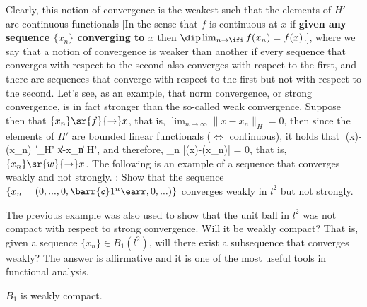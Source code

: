 \espa
Clearly, this notion of convergence is the weakest such that the 
elements
of $H'$ are continuous functionals [In the sense that $f$ is
continuous at $x$ if {\bf given any sequence $\{x_n\}$
converging to $x$} then $\dip\lim_{n\to\ifi}f(x_n)=f(x)$.], where we say 
that a notion of
convergence is weaker than another if every sequence that
converges with respect to
the second also converges with respect to the first, and there are sequences
that converge with respect to the first but not with respect to the second.
Let's see, as an example, that norm convergence, or strong convergence, is in
fact stronger than the so-called weak convergence.
Suppose then that $\{x_n\} \sr{f}{\rightarrow} x$, that is,
$\lim_{n \to \infty} \|x-x_n\|_H =0$, then since the elements of
$H'$ are bounded linear functionals ($\Longleftrightarrow$ continuous), it holds that 
\beq 
|\sigma(x)-\sigma(x_n)| \leq \|\sigma\|_{H'} \|x-x_n\|\;\;\;\;\;\; \forall \;\;\;\;
\sigma \in H',
\eeq
and therefore, 
\beq
\lim_{n\to\ifi} |\sigma(x)-\sigma(x_n)| = 0,
\eeq 
that is, $\{x_n\} \sr{w}{\rightarrow} 
x$.
The following is an example of a sequence that converges weakly
and not strongly.
\espa
\ejer: 
Show that the sequence $\{x_n = (0,...,0,
\barr{c} \\ 1\\ ^n \earr,0,...)\}$ 
converges
weakly in $l^2$ but not strongly.

The previous example was also used to show that the unit ball 
in $l^2$ was not compact with respect to strong convergence.
Will it be weakly compact? That is, given a sequence 
$\{x_n\} \in B_1(l^2)$, will there exist a subsequence that converges weakly?
The answer is affirmative and it is one of the most useful tools
in functional analysis.

\bteo 
$B_1$ is weakly compact.
\eteo

